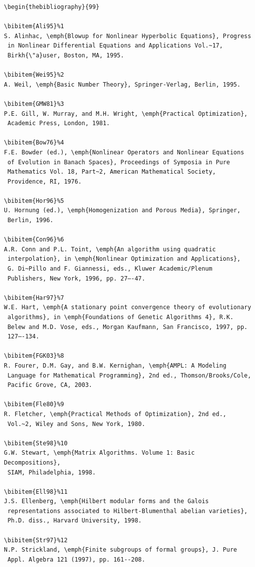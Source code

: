 \documentclass[]{interact}
\theoremstyle{plain}%
\theoremstyle{definition}
\theoremstyle{remark}
\begin{document}
\begin{verbatim}
\begin{thebibliography}{99}

\bibitem{Ali95}%1
S. Alinhac, \emph{Blowup for Nonlinear Hyperbolic Equations}, Progress
 in Nonlinear Differential Equations and Applications Vol.~17,
 Birkh{\"a}user, Boston, MA, 1995.

\bibitem{Wei95}%2
A. Weil, \emph{Basic Number Theory}, Springer-Verlag, Berlin, 1995.

\bibitem{GMW81}%3
P.E. Gill, W. Murray, and M.H. Wright, \emph{Practical Optimization},
 Academic Press, London, 1981.

\bibitem{Bow76}%4
F.E. Bowder (ed.), \emph{Nonlinear Operators and Nonlinear Equations
 of Evolution in Banach Spaces}, Proceedings of Symposia in Pure
 Mathematics Vol. 18, Part~2, American Mathematical Society,
 Providence, RI, 1976.

\bibitem{Hor96}%5
U. Hornung (ed.), \emph{Homogenization and Porous Media}, Springer,
 Berlin, 1996.

\bibitem{Con96}%6
A.R. Conn and P.L. Toint, \emph{An algorithm using quadratic
 interpolation}, in \emph{Nonlinear Optimization and Applications},
 G. Di~Pillo and F. Giannessi, eds., Kluwer Academic/Plenum
 Publishers, New York, 1996, pp. 27–-47.

\bibitem{Har97}%7
W.E. Hart, \emph{A stationary point convergence theory of evolutionary
 algorithms}, in \emph{Foundations of Genetic Algorithms 4}, R.K.
 Belew and M.D. Vose, eds., Morgan Kaufmann, San Francisco, 1997, pp.
 127–-134.

\bibitem{FGK03}%8
R. Fourer, D.M. Gay, and B.W. Kernighan, \emph{AMPL: A Modeling
 Language for Mathematical Programming}, 2nd ed., Thomson/Brooks/Cole,
 Pacific Grove, CA, 2003.

\bibitem{Fle80}%9
R. Fletcher, \emph{Practical Methods of Optimization}, 2nd ed.,
 Vol.~2, Wiley and Sons, New York, 1980.

\bibitem{Ste98}%10
G.W. Stewart, \emph{Matrix Algorithms. Volume 1: Basic Decompositions},
 SIAM, Philadelphia, 1998.

\bibitem{Ell98}%11
J.S. Ellenberg, \emph{Hilbert modular forms and the Galois
 representations associated to Hilbert-Blumenthal abelian varieties},
 Ph.D. diss., Harvard University, 1998.

\bibitem{Str97}%12
N.P. Strickland, \emph{Finite subgroups of formal groups}, J. Pure
 Appl. Algebra 121 (1997), pp. 161--208.


\end{verbatim}
\end{document}
